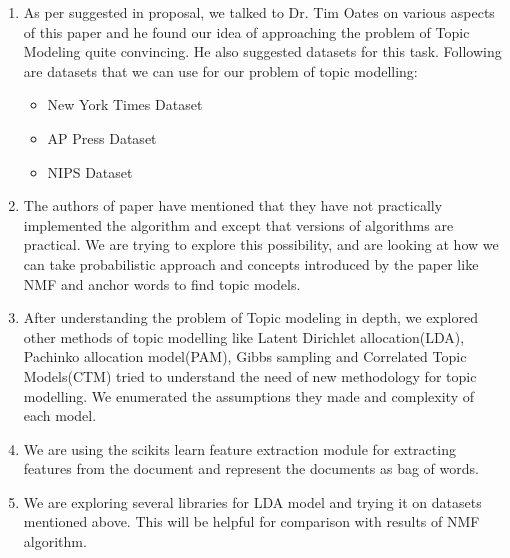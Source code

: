 \documentclass[a4paper,11pt]{article}
\begin{document}
\begin{enumerate}

\item As per suggested in proposal, we talked to Dr. Tim Oates on various aspects of this paper and he found our idea of approaching the problem of Topic Modeling quite convincing. He also suggested datasets for this task. Following are datasets that we can use for our problem of topic modelling:

\begin{itemize}
\item New York Times Dataset
\item AP Press Dataset
\item NIPS Dataset
\end{itemize}

\item The authors of paper have mentioned that they have not practically implemented the algorithm and except that versions of algorithms are practical. We are trying to explore this possibility, and are looking at how we can take probabilistic approach and concepts introduced by the paper like NMF and anchor words to find topic models.

\item After understanding the problem of Topic modeling in depth, we explored other methods of topic modelling like Latent Dirichlet allocation(LDA), Pachinko allocation model(PAM), Gibbs sampling and Correlated Topic Models(CTM) tried to understand the need of new methodology for topic modelling. We enumerated the assumptions they made and complexity of each model. 

\item We are using the scikits learn feature extraction module for extracting features from the document and represent the documents as bag of words. 

\item We are exploring several libraries for LDA model and trying it on datasets mentioned above. This will be helpful for comparison with results of NMF algorithm.

\end{enumerate}
\end{document}
